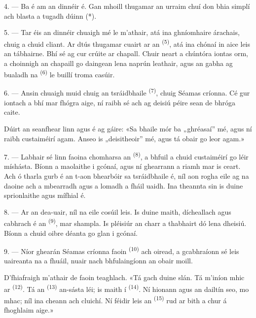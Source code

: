 4. --- Ba é am an dinnéir é. Gan mhoill thugamar an urraim chuí don bhia simplí ach
blasta a tugadh dúinn (*).

\VUsaut{3.0mm}

5. --- Tar éis an dinnéir chuaigh mé le m'athair, atá ina ghníomhaire árachais,
chuig a chuid cliant. Ar dtús thugamar cuairt ar an 
\textsuperscript{(5)}, atá ina chónaí in aice leis an tábhairne. Bhí sé ag cur crúite
ar chapall. Chuir neart a chúntóra iontas orm, a choinnigh  an chapaill
go daingean lena naprún leathair, agus an gabha ag bualadh na 
\textsuperscript{(6)} le buillí troma casúir.

6. --- Ansin chuaigh muid chuig  an tsráidbhaile
\textsuperscript{(7)}, chuig Séamas críonna. Cé gur  iontach a bhí
mar fhógra aige, ní raibh sé ach ag deisiú péire sean de bhróga caite.

Dúirt an seanfhear linn agus é ag gáire: «Sa bhaile mór ba „ghréasaí” mé, agus ní
raibh custaiméirí agam. Anseo is „deisitheoir” mé, agus tá obair go leor agam.»

7. --- Labhair sé linn faoina chomharsa an 
\textsuperscript{(8)}, a bhfuil a chuid custaiméirí go léir míshásta. Bíonn a
 maolaithe i gcónaí, agus ní ghearrann a  riamh mar
is ceart. Ach ó tharla gurb é an t-aon bhearbóir sa tsráidbhaile é, níl aon rogha
eile ag na daoine ach a mbearradh agus a lomadh a fháil uaidh. Ina theannta sin is
duine sprionlaithe agus mífhial é.

8. --- Ar an dea-uair, níl na  eile cosúil leis. Is duine maith,
dícheallach agus cabhrach é an  \textsuperscript{(9)}, mar
shampla. Is pléisiúr an charr a thabhairt dó lena dheisiú. Bíonn a chuid oibre
déanta go glan i gcónaí.

9. --- Níor ghearán Séamas críonna faoin 
\textsuperscript{(10)} ach oiread, a gcabhraíonn sé leis uaireanta na
 a fhuáil, nuair nach bhfulaingíonn an obair moill.

D'fhiafraigh m'athair de faoin teaghlach. «Tá gach duine slán. Tá m'iníon mhic ar
 \textsuperscript{(12)}. Tá an 
\textsuperscript{(13)} an-sásta léi; is  maith í
\textsuperscript{(14)}. Ní hionann agus an dailtín seo, mo mhac; níl ina cheann ach
cluichí. Ní féidir leis an  \textsuperscript{(15)} rud ar bith a
chur á fhoghlaim aige.»

